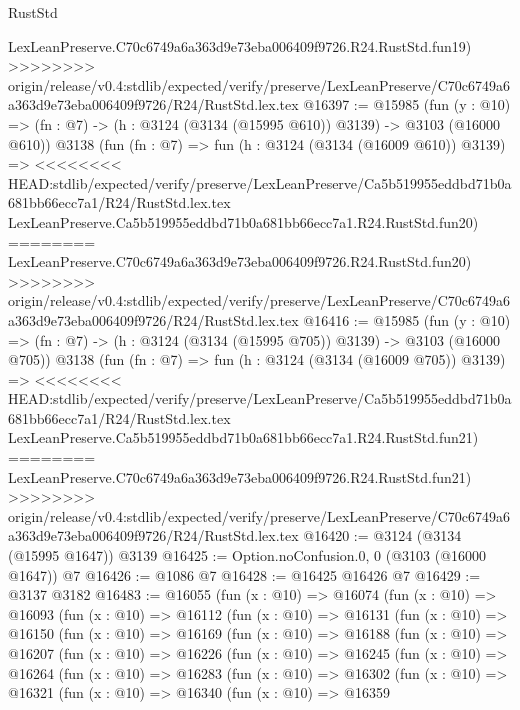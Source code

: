 \begin{lexlean}{RustStd}
\begin{coremodule}
{\begin{coremodule}
{{{{{{{{{{{{{{{{{{{{{{{{{{    LexLeanPreserve.C70c6749a6a363d9e73eba006409f9726.R24.RustStd.fun19)
>>>>>>>> origin/release/v0.4:stdlib/expected/verify/preserve/LexLeanPreserve/C70c6749a6a363d9e73eba006409f9726/R24/RustStd.lex.tex
@16397 := @15985
    (fun (y : @10) => (fn : @7) -> (h : @3124 (@3134 (@15995 @610)) @3139) -> @3103 (@16000 @610))
    @3138
    (fun (fn : @7) =>
    fun (h : @3124 (@3134 (@16009 @610)) @3139) =>
<<<<<<<< HEAD:stdlib/expected/verify/preserve/LexLeanPreserve/Ca5b519955eddbd71b0a681bb66ecc7a1/R24/RustStd.lex.tex
    LexLeanPreserve.Ca5b519955eddbd71b0a681bb66ecc7a1.R24.RustStd.fun20)
========
    LexLeanPreserve.C70c6749a6a363d9e73eba006409f9726.R24.RustStd.fun20)
>>>>>>>> origin/release/v0.4:stdlib/expected/verify/preserve/LexLeanPreserve/C70c6749a6a363d9e73eba006409f9726/R24/RustStd.lex.tex
@16416 := @15985
    (fun (y : @10) => (fn : @7) -> (h : @3124 (@3134 (@15995 @705)) @3139) -> @3103 (@16000 @705))
    @3138
    (fun (fn : @7) =>
    fun (h : @3124 (@3134 (@16009 @705)) @3139) =>
<<<<<<<< HEAD:stdlib/expected/verify/preserve/LexLeanPreserve/Ca5b519955eddbd71b0a681bb66ecc7a1/R24/RustStd.lex.tex
    LexLeanPreserve.Ca5b519955eddbd71b0a681bb66ecc7a1.R24.RustStd.fun21)
========
    LexLeanPreserve.C70c6749a6a363d9e73eba006409f9726.R24.RustStd.fun21)
>>>>>>>> origin/release/v0.4:stdlib/expected/verify/preserve/LexLeanPreserve/C70c6749a6a363d9e73eba006409f9726/R24/RustStd.lex.tex
@16420 := @3124 (@3134 (@15995 @1647)) @3139
@16425 := Option.noConfusion.{0, 0} (@3103 (@16000 @1647)) @7
@16426 := @1086 @7
@16428 := @16425 @16426 @7
@16429 := @3137 @3182
@16483 := @16055
    (fun (x : @10) =>
    @16074
      (fun (x : @10) =>
      @16093
        (fun (x : @10) =>
        @16112
          (fun (x : @10) =>
          @16131
            (fun (x : @10) =>
            @16150
              (fun (x : @10) =>
              @16169
                (fun (x : @10) =>
                @16188
                  (fun (x : @10) =>
                  @16207
                    (fun (x : @10) =>
                    @16226
                      (fun (x : @10) =>
                      @16245
                        (fun (x : @10) =>
                        @16264
                          (fun (x : @10) =>
                          @16283
                            (fun (x : @10) =>
                            @16302
                              (fun (x : @10) =>
                              @16321
                                (fun (x : @10) =>
                                @16340
                                  (fun (x : @10) =>
                                  @16359
}}}}}}}}}}}}}}}}}}}}}}}}}}
\end{coremodule}}
\end{coremodule}
\end{lexlean}

